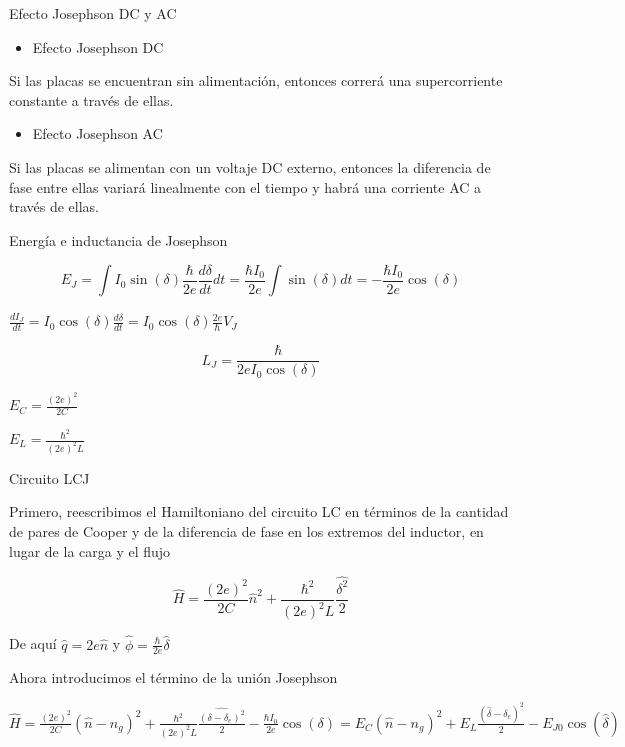 \begin{frame}{Efecto Josephson DC y AC}
\protect\hypertarget{efecto-josephson-dc-y-ac}{}

\begin{itemize}
\tightlist
\item
  Efecto Josephson DC
\end{itemize}

Si las placas se encuentran sin alimentación, entonces correrá una
supercorriente constante a través de ellas.

\begin{itemize}
\tightlist
\item
  Efecto Josephson AC
\end{itemize}

Si las placas se alimentan con un voltaje DC externo, entonces la
diferencia de fase entre ellas variará linealmente con el tiempo y habrá
una corriente AC a través de ellas.

\end{frame}

\begin{frame}{Energía e inductancia de Josephson}
\protect\hypertarget{energuxeda-e-inductancia-de-josephson}{}

\[E_J = \int I_0 \sin(\delta) \frac{\hbar}{2e} \frac{d\delta}{dt} dt
 = \frac{\hbar I_0}{2e} \int \sin(\delta) dt
 = - \frac{\hbar I_0}{2e} \cos(\delta)\]

\(\frac{dI_J}{dt} = I_0 \cos(\delta) \frac{d \delta}{dt} = I_0 \cos(\delta)  \frac{2e}{\hbar} V_J\)

\[L_J = \frac{\hbar}{2e I_0 \cos(\delta)}\]

\(E_C = \frac{(2e)^2}{2C}\)

\(E_L = \frac{\hbar^2}{(2e)^2L}\)

\end{frame}

\begin{frame}{Circuito LCJ}
\protect\hypertarget{circuito-lcj}{}

Primero, reescribimos el Hamiltoniano del circuito LC en términos de la
cantidad de pares de Cooper y de la diferencia de fase en los extremos
del inductor, en lugar de la carga y el flujo

\[\hat{H} = \frac{(2e)^2}{2C} \hat{n}^2 + \frac{\hbar^2}{(2e)^2L} 
 \frac{\hat{\delta^2}}{2}\]

De aquí \(\hat{q}=2e\hat{n}\) y
\(\hat{\phi}=\frac{\hbar}{2e}\hat{\delta}\)

Ahora introducimos el término de la unión Josephson

\(\hat{H} = \frac{(2e)^2}{2C} (\hat{n}-n_g)^2 + \frac{\hbar^2}{(2e)^2L}  \frac{\hat{(\delta-\delta_e)^2}}{2} - \frac{\hbar I_0}{2e} \cos(\delta)  = E_C (\hat{n}-n_g)^2 + E_L \frac{(\hat{\delta}-\delta_e)^2}{2}  - E_{J0} \cos(\hat{\delta})\)

\end{frame}

